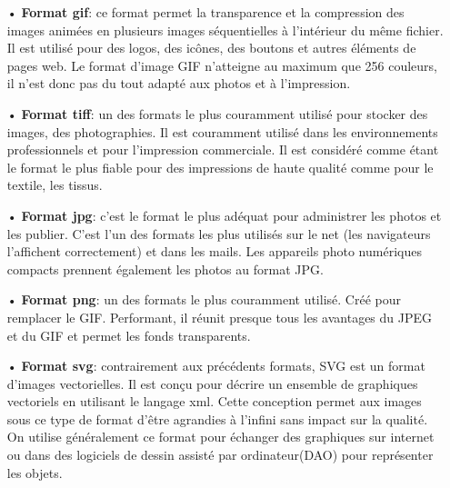     \begin{itemize}
        \item[•]\textbf{Format \acrfull{gif}}: ce format permet la transparence et la compression des images animées en plusieurs images séquentielles à l’intérieur du même fichier.
        Il est utilisé pour des logos, des icônes, des boutons et autres éléments de pages web. Le format d’image GIF n’atteigne au maximum que 256 couleurs, il n’est donc pas du tout adapté aux photos et à l’impression.
        \item[•]\textbf{Format \acrfull{tiff}}: un des formats le plus couramment utilisé pour stocker des images, des photographies. Il est couramment utilisé dans les environnements professionnels et pour l’impression commerciale. Il est considéré comme étant le format le plus fiable pour des impressions de haute qualité comme pour le textile, les tissus.
        \item[•]\textbf{Format \acrfull{jpg}}: c’est le format le plus adéquat pour administrer les photos et les publier. C'est l'un des formats les plus utilisés sur le net (les navigateurs l’affichent correctement) et dans les mails. Les appareils photo numériques compacts prennent également les photos au format JPG.
        \item[•]\textbf{Format \acrfull{png}}: un des formats le plus couramment utilisé. Créé pour remplacer le GIF. Performant, il réunit presque tous les avantages du JPEG et du GIF et permet les fonds transparents. \cite{akacemMaster}
        \item[•]\textbf{Format \acrfull{svg}}: contrairement aux précédents formats, SVG est un format d’images vectorielles. Il est conçu pour décrire un ensemble de graphiques vectoriels en utilisant le langage \acrshort{xml}. Cette conception permet aux images sous ce type de format d’être agrandies à l’infini sans impact sur la qualité. On utilise généralement ce format pour échanger des graphiques sur internet ou dans des logiciels de dessin assisté par ordinateur(DAO) pour représenter les objets.    
    \end{itemize}